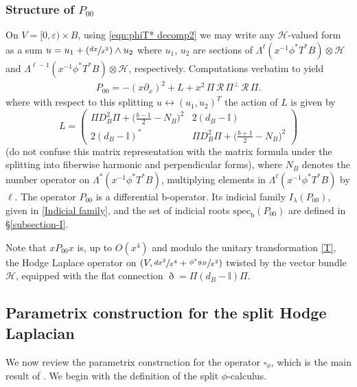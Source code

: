 \documentclass[11pt]{article}
\numberwithin{equation}{section}
\newcommand{\Psfrac}[2]{(\sfrac{#1}{#2})}
\theoremstyle{plain}
\theoremstyle{definition}
\newcommand{\calH}{{\mathscr{H}}}
\newcommand{\bb}{{\mathrm{b}}}
\newcommand{\specb}{\mathrm{spec}_\bb}
\let\eps\varepsilon
\begin{document}
\subsubsection*{Structure of $P_{00}$}
On $V = [0,\eps)\times B$, using \eqref{eqn:phiT* decomp2} we may write any $\calH$-valued form as a sum
$u = u_1 + \Psfrac{dx}{x^2}\wedge u_2$ where $u_1$, $u_2$ are sections of $\Lambda^\ell (x^{-1} \phi^*T^*B) \otimes
\mathscr{H}$ and $\Lambda^{\ell-1} (x^{-1} \phi^*T^*B) \otimes
\mathscr{H}$, respectively.
Computations verbatim to \cite[(15)]{guillarmou2014low} yield
\begin{align}\label{indicial-operator-2}
P_{00}
= -(x\partial_x)^{2} + L + x^2 \,\Pi \,\mathscr{R} \,\Pi^\perp \,\mathscr{R} \,\Pi.
\end{align}
where with respect to this splitting $u \leftrightarrow (u_1,u_2)^T$ the action of $L$
is given by
\begin{equation}\label{LL}
L = \left(\begin{array}{cc}
\Pi D^2_{B} \Pi + \bigl(\frac{b-1}2-N_B\bigr)^{2} &2(d_B - \mathbb{I}) \\
2(d_B - \mathbb{I})^* & \Pi D^2_B \Pi + \bigl(\frac{b+1}2-N_B\bigr)^{2}
\end{array} \right)
\end{equation}
(do not confuse this matrix representation with
the matrix formula under the splitting into fiberwise harmonic and perpendicular forms),
where $N_B$ denotes the number opera\-tor on $\Lambda^*(x^{-1} \phi^*T^*B)$,
multiplying elements in $\Lambda^\ell(x^{-1} \phi^*T^*B)$ by $\ell$. The operator
$P_{00}$ is a differential b-operator. Its indicial family $I_\lambda(P_{00})$, given in \eqref{Indicial family},
and the set of indicial roots $\specb(P_{00})$ are defined in \S \ref{subsection-I}.

Note that $xP_{00}x$ is, up to $O(x^4)$ and modulo the unitary transformation \eqref{T}, the Hodge Laplace operator on $(V, \sfrac{dx^2}{x^4}+ \sfrac{\phi^*g_B}{x^2})$ twisted by the vector bundle~$\calH$, equipped with the flat connection $\eth = \Pi(d_{B} - \mathbb{I})\Pi$.

\subsection{Parametrix construction for the split Hodge Laplacian} \label{review grieser-para}
We now review the parametrix construction for the operator $\square_\phi$,
which is the main result of \cite{grieser-para}. We begin with the definition
of the split $\phi$-calculus.
\end{document}
